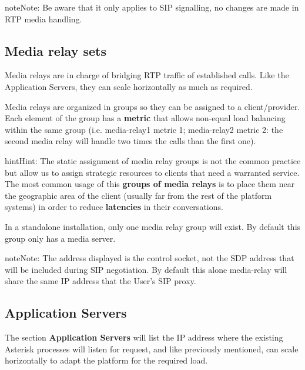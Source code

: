 \documentclass[letterpaper,10pt,english]{sphinxmanual}
\begin{document}
\begin{notice}{note}{Note:}
Be aware that it only applies to SIP signalling, no changes are made in RTP media handling.
\end{notice}


\subsection{Media relay sets}
\label{administration_portal/platform/infrastructure/media_relay_sets::doc}\label{administration_portal/platform/infrastructure/media_relay_sets:media-relay-sets}
Media relays are in charge of bridging RTP traffic of established calls. Like
the Application Servers, they can scale horizontally as much as required.

Media relays are organized in groups so they can be assigned to a client/provider. Each
element of the group has a \textbf{metric} that allows non-equal load balancing
within the same group (i.e. media-relay1 metric 1; media-relay2 metric 2:
the second media relay will handle two times the calls than the first one).

\begin{notice}{hint}{Hint:}
The static assignment of media relay groups is not the common practice
but allow us to assign strategic resources to clients that need a warranted
service. The most common usage of this \textbf{groups of media relays} is to
place them near the geographic area of the client (usually far from the
rest of the platform systems) in order to reduce \textbf{latencies} in their
conversations.
\end{notice}

In a standalone installation, only one media relay group will exist. By default this group only has a media server.

\begin{notice}{note}{Note:}
The address displayed is the control socket, not the SDP address that
will be included during SIP negotiation. By default this alone media-relay
will share the same IP address that the User's SIP proxy.
\end{notice}


\subsection{Application Servers}
\label{administration_portal/platform/infrastructure/application_servers::doc}\label{administration_portal/platform/infrastructure/application_servers:application-servers}
The section \textbf{Application Servers} will list the IP address where the existing
Asterisk processes will listen for request, and like previously mentioned,
can scale horizontally to adapt the platform for the required load.
\end{document}
